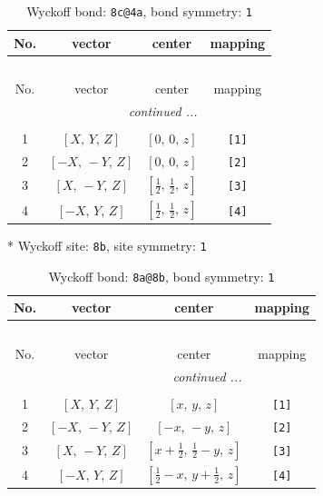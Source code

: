 \documentclass[fleqn,8pt]{jsarticle}
\begin{document}
\renewcommand{\arraystretch}{1.2}
\begin{longtable}{cccc}
\caption{Wyckoff bond: {\tt 8c@4a}, bond symmetry: {\tt 1}}
 \\
 \hline \hline
No. & vector & center & mapping \\ \hline \endfirsthead

\multicolumn{3}{l}{\tablename\ \thetable{}} \\
 \hline \hline
No. & vector & center & mapping \\ \hline \endhead

 \hline \hline
\multicolumn{3}{r}{\footnotesize\it continued ...} \\ \endfoot

 \hline \hline
\multicolumn{3}{r}{} \\ \endlastfoot

1 & $\left[ X,\, Y,\, Z \right]$ & $\left[ 0,\, 0,\, z \right]$ & {\tt [1]} \\ \hline
2 & $\left[ - X,\, - Y,\, Z \right]$ & $\left[ 0,\, 0,\, z \right]$ & {\tt [2]} \\ \hline
3 & $\left[ X,\, - Y,\, Z \right]$ & $\left[ \frac{1}{2},\, \frac{1}{2},\, z \right]$ & {\tt [3]} \\ \hline
4 & $\left[ - X,\, Y,\, Z \right]$ & $\left[ \frac{1}{2},\, \frac{1}{2},\, z \right]$ & {\tt [4]} \\
\end{longtable}
* Wyckoff site: {\tt 8b}, site symmetry: {\tt 1}
\renewcommand{\arraystretch}{1.2}
\begin{longtable}{cccc}
\caption{Wyckoff bond: {\tt 8a@8b}, bond symmetry: {\tt 1}}
 \\
 \hline \hline
No. & vector & center & mapping \\ \hline \endfirsthead

\multicolumn{3}{l}{\tablename\ \thetable{}} \\
 \hline \hline
No. & vector & center & mapping \\ \hline \endhead

 \hline \hline
\multicolumn{3}{r}{\footnotesize\it continued ...} \\ \endfoot

 \hline \hline
\multicolumn{3}{r}{} \\ \endlastfoot

1 & $\left[ X,\, Y,\, Z \right]$ & $\left[ x,\, y,\, z \right]$ & {\tt [1]} \\ \hline
2 & $\left[ - X,\, - Y,\, Z \right]$ & $\left[ - x,\, - y,\, z \right]$ & {\tt [2]} \\ \hline
3 & $\left[ X,\, - Y,\, Z \right]$ & $\left[ x + \frac{1}{2},\, \frac{1}{2} - y,\, z \right]$ & {\tt [3]} \\ \hline
4 & $\left[ - X,\, Y,\, Z \right]$ & $\left[ \frac{1}{2} - x,\, y + \frac{1}{2},\, z \right]$ & {\tt [4]} \\
\end{longtable}
\end{document}
